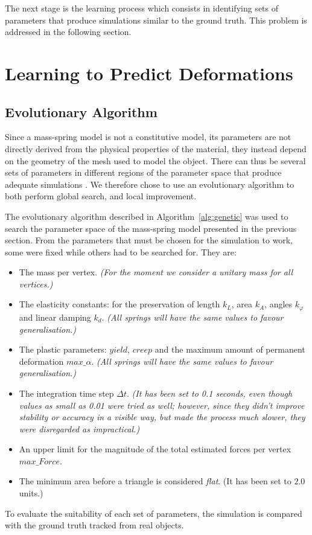 \documentclass[journal]{IEEEtran}
\newcommand{\alref}[1]{Algorithm~\ref{#1}}
\newcounter{algorithm}
\begin{document}
The next stage is the learning process which consists in identifying sets of parameters that produce simulations similar to the ground truth.  This problem is addressed in the following section.


\section{Learning to Predict Deformations}
\label{sec:learning}

\subsection{Evolutionary Algorithm}
\label{sub:EvolAlg}

Since a mass-spring model is not a constitutive model, its parameters are not directly derived from the physical properties of the material, they instead depend on the geometry of the mesh used to model the object. There can thus be several sets of parameters in different regions of the parameter space that produce adequate simulations \cite{Morris2008}. We therefore chose to use an evolutionary algorithm to both perform global search, and local improvement.

The evolutionary algorithm described in \alref{alg:genetic} was used to search the parameter space of the mass-spring model presented in the previous section.
From the parameters that must be chosen for the simulation to work, some were fixed while others had to be searched for.  They are:
\begin{itemize}
 \item The mass per vertex.  \textit{(For the moment we consider a unitary mass for all vertices.)}
 \item The elasticity constants: for the preservation of length $k_L$, area $k_A$, angles $k_{\varphi}$ and linear damping $k_d$.  \textit{(All springs will have the same values to favour generalisation.)}
 \item The plastic parameters: $yield$, $creep$ and the maximum amount of permanent deformation $max\_\alpha$.  \textit{(All springs will have the same values to favour generalisation.)}
  \item The integration time step $\Delta t$.  \textit{(It has been set to 0.1 seconds, even though values as small as 0.01 were tried as well; however, since they didn't improve stability or accuracy in a visible way, but made the process much slower, they were disregarded as impractical.)}
 \item An upper limit for the magnitude of the total estimated forces per vertex $max\_Force$.
 \item The minimum area before a triangle is considered \textit{flat}.  (It has been set to $2.0$ units.)
\end{itemize}
To evaluate the suitability of each set of parameters, the simulation is compared with the ground truth tracked from real objects.
\end{document}
